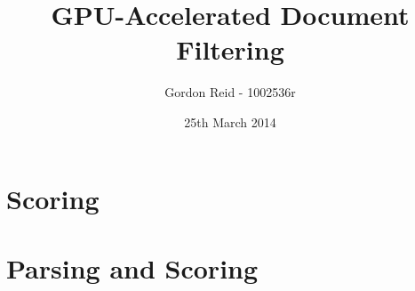\documentclass{beamer}
\title{GPU-Accelerated Document Filtering}
\author{Gordon Reid - 1002536r}
\date{25th March 2014}
\begin{document}
\frame{\titlepage}
\frame{\tableofcontents}
\section{Scoring}
\section{Parsing and Scoring}
\end{document}
